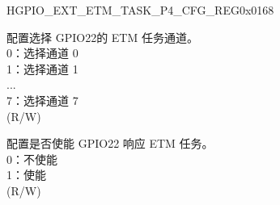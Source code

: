 \begin{register}{H}{GPIO\_EXT\_ETM\_TASK\_P4\_CFG\_REG}{0x0168}\label{regdesc:GPIOEXTETMTASKP4CFGREG}
%
%
%
%
%
%
%
%
%
%
%
%
%
%
%
%
\regnewline%
\begin{regdesc}\begin{reglist}
\label{fielddesc:GPIOEXTETMTASKGPIO22SEL}\item [GPIO\_EXT\_ETM\_TASK\_GPIO22\_SEL] 配置选择 GPIO22的 ETM 任务通道。\\
0：选择通道 0\\
1：选择通道 1\\
...\\
7：选择通道 7\\ (R/W)
\label{fielddesc:GPIOEXTETMTASKGPIO22EN}\item [GPIO\_EXT\_ETM\_TASK\_GPIO22\_EN] 配置是否使能 GPIO22 响应 ETM 任务。\\
0：不使能\\
1：使能\\ (R/W)
\item [见下页]
\end{reglist}\end{regdesc}
\end{register}

